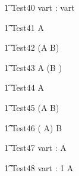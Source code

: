 \begin{circusaction}
   \t1 Test40 \circdef \circvres vart : \nat  \circspot  \circwait  vart \\
\end{circusaction}


\begin{circusaction}
   \t1 Test41 \circdef  A \circseq {}   \\
\end{circusaction}

\begin{circusaction}
   \t1 Test42 \circdef  (A \circseq B) \circseq {} \\
\end{circusaction}

\begin{circusaction}
   \t1 Test43 \circdef  A \circseq (B \circseq {}) \\
\end{circusaction}

\begin{circusaction}
   \t1 Test44 \circdef  {} \circseq A \\
\end{circusaction}

\begin{circusaction}
   \t1 Test45 \circdef  {} \circseq (A \circseq B) \\
\end{circusaction}

\begin{circusaction}
   \t1 Test46 \circdef  ( \circseq A) \circseq B \\
\end{circusaction}


\begin{circusaction}
  \t1 Test47 \circdef \circwait vart : \nat  \circspot A \\
\end{circusaction}

\begin{circusaction}
  \t1 Test48 \circdef \circwait vart : 1   \circspot  A \\
\end{circusaction}


